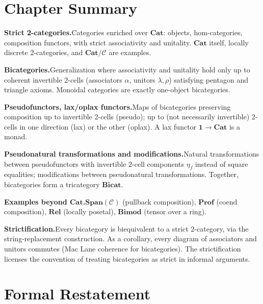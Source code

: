 \section*{Chapter Summary}

\begin{summarybox}
\textbf{Strict 2-categories.}\quad Categories enriched over $\mathbf{Cat}$:
objects, hom-categories, composition functors, with strict associativity and
unitality. $\mathbf{Cat}$ itself, locally discrete 2-categories, and
$\mathbf{Cat}/\mathcal{C}$ are examples.

\textbf{Bicategories.}\quad Generalization where associativity and unitality
hold only up to coherent invertible 2-cells (associators $\alpha$, unitors
$\lambda, \rho$) satisfying pentagon and triangle axioms. Monoidal categories
are exactly one-object bicategories.

\textbf{Pseudofunctors, lax/oplax functors.}\quad Maps of bicategories
preserving composition up to invertible 2-cells (pseudo); up to (not
necessarily invertible) 2-cells in one direction (lax) or the other (oplax).
A lax functor $\mathbf{1} \to \mathbf{Cat}$ is a monad.

\textbf{Pseudonatural transformations and modifications.}\quad Natural
transformations between pseudofunctors with invertible 2-cell components
$\eta_f$ instead of square equalities; modifications between pseudonatural
transformations. Together, bicategories form a tricategory $\mathbf{Bicat}$.

\textbf{Examples beyond $\mathbf{Cat}$.}\quad $\mathbf{Span}(\mathcal{C})$
(pullback composition), $\mathbf{Prof}$ (coend composition), $\mathbf{Rel}$
(locally posetal), $\mathbf{Bimod}$ (tensor over a ring).

\textbf{Strictification.}\quad Every bicategory is biequivalent to a strict
2-category, via the string-replacement construction. As a corollary, every
diagram of associators and unitors commutes (Mac Lane coherence for
bicategories). The strictification licenses the convention of treating
bicategories as strict in informal arguments.
\end{summarybox}


\section*{Formal Restatement}

